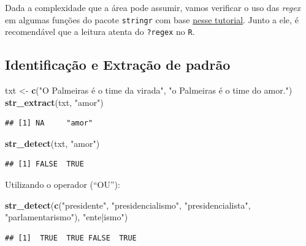 \documentclass[]{book}
\newenvironment{Shaded}{\begin{snugshade}}{\end{snugshade}}
\newcommand{\KeywordTok}[1]{\textcolor[rgb]{0.13,0.29,0.53}{\textbf{#1}}}
\newcommand{\NormalTok}[1]{#1}
\newcommand{\StringTok}[1]{\textcolor[rgb]{0.31,0.60,0.02}{#1}}
\begin{document}
Dada a complexidade que a área pode assumir, vamos verificar o uso das \emph{regex} em algumas funções do pacote \texttt{stringr} com base \href{https://cran.r-project.org/web/packages/stringr/vignettes/regular-expressions.html}{nesse tutorial}. Junto a ele, é recomendável que a leitura atenta do \texttt{?regex} no \texttt{R}.

\hypertarget{identificauxe7uxe3o-e-extrauxe7uxe3o-de-padruxe3o}{%
\subsection{Identificação e Extração de padrão}\label{identificauxe7uxe3o-e-extrauxe7uxe3o-de-padruxe3o}}

\begin{Shaded}
\begin{Highlighting}[]
\NormalTok{txt <-}\StringTok{ }\KeywordTok{c}\NormalTok{(}\StringTok{"O Palmeiras é o time da virada"}\NormalTok{, }\StringTok{"o Palmeiras é o time do amor."}\NormalTok{)}
\KeywordTok{str_extract}\NormalTok{(txt, }\StringTok{"amor"}\NormalTok{)}
\end{Highlighting}
\end{Shaded}

\begin{verbatim}
## [1] NA     "amor"
\end{verbatim}

\begin{Shaded}
\begin{Highlighting}[]
\KeywordTok{str_detect}\NormalTok{(txt, }\StringTok{"amor"}\NormalTok{)}
\end{Highlighting}
\end{Shaded}

\begin{verbatim}
## [1] FALSE  TRUE
\end{verbatim}

Utilizando o operador \texttt{\textbar{}} (``OU''):

\begin{Shaded}
\begin{Highlighting}[]
\KeywordTok{str_detect}\NormalTok{(}\KeywordTok{c}\NormalTok{(}\StringTok{"presidente"}\NormalTok{, }\StringTok{"presidencialismo"}\NormalTok{, }\StringTok{"presidencialista"}\NormalTok{, }\StringTok{"parlamentarismo"}\NormalTok{), }\StringTok{"ente|ismo"}\NormalTok{)}
\end{Highlighting}
\end{Shaded}

\begin{verbatim}
## [1]  TRUE  TRUE FALSE  TRUE
\end{verbatim}
\end{document}
